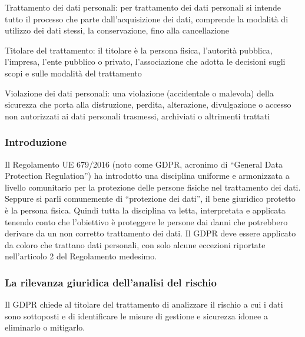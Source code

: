 Trattamento dei dati personali: per trattamento dei dati personali si intende tutto il processo che parte dall’acquisizione dei dati, comprende la modalità di utilizzo dei dati stessi, la conservazione, fino alla cancellazione 

Titolare del trattamento: il titolare è la persona fisica, l'autorità pubblica, l'impresa, l'ente pubblico o privato, l'associazione che adotta le decisioni sugli scopi e sulle modalità del trattamento

Violazione dei dati personali: una violazione (accidentale o malevola) della sicurezza che porta alla distruzione, perdita, alterazione, divulgazione o accesso non autorizzati ai dati personali trasmessi, archiviati o altrimenti trattati
\subsubsection{Introduzione}
\cite{gdpr}\cite{gdpr2}Il Regolamento UE 679/2016 (noto come GDPR, acronimo di “General Data Protection Regulation”) ha introdotto una disciplina uniforme e armonizzata a livello comunitario per la protezione delle persone fisiche nel trattamento dei dati.
Seppure si parli comunemente di “protezione dei dati”, il bene giuridico protetto è la
persona fisica. Quindi tutta la disciplina va letta, interpretata e applicata tenendo conto
che l’obiettivo è proteggere le persone dai danni che potrebbero derivare da un non corretto trattamento dei dati.
Il GDPR deve essere applicato da coloro che trattano dati personali, con solo alcune
eccezioni riportate nell’articolo 2 del Regolamento medesimo.
\subsubsection{La rilevanza giuridica dell’analisi del rischio}
Il GDPR chiede al titolare del trattamento di analizzare il rischio a cui i dati sono sottoposti e di identificare le misure di gestione e sicurezza idonee a eliminarlo o mitigarlo.
